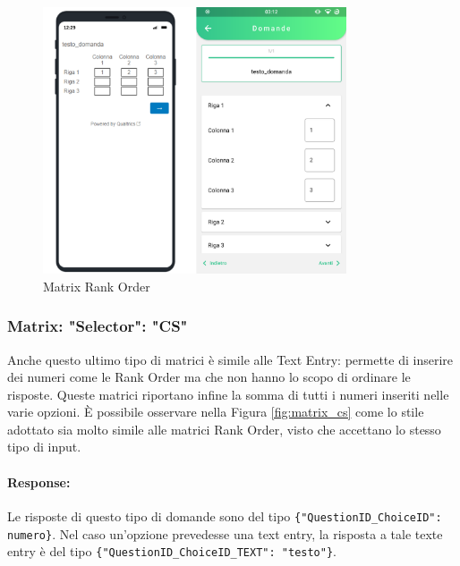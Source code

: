 \begin{figure}[h!]
\centering
\includegraphics[width=0.8\textwidth]{img/matrix_ro}
\caption{Matrix Rank Order}
\label{fig:matrix_ro}
\end{figure}

\clearpage
\subsubsection{Matrix: "Selector": "CS"}
Anche questo ultimo tipo di matrici è simile alle Text Entry: permette di inserire dei numeri come le Rank Order ma che non hanno lo scopo di ordinare le risposte. Queste matrici riportano infine la somma di tutti i numeri inseriti nelle varie opzioni. È possibile osservare nella Figura \ref{fig:matrix_cs} come lo stile adottato sia molto simile alle matrici Rank Order, visto che accettano lo stesso tipo di input.

\paragraph{Response:}
Le risposte di questo tipo di domande sono del tipo \texttt{\{"QuestionID\_ChoiceID": numero\}}. Nel caso un'opzione prevedesse una text entry, la risposta a tale texte entry è del tipo \texttt{\{"QuestionID\_ChoiceID\_TEXT": "testo"\}}.

